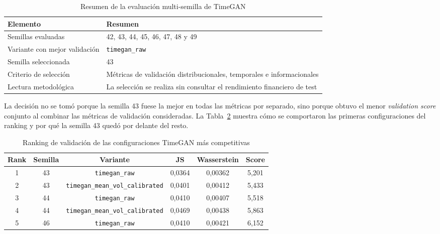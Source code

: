 \documentclass[11pt,a4paper,spanish,oneside]{book}
\numberwithin{equation}{chapter}
\numberwithin{figure}{chapter}
\begin{document}
{\small
\renewcommand{\arraystretch}{1.2}
\begin{table}[H]
\centering
\begin{tabular}{|p{}|p{}|}
\hline
\textbf{Elemento} & \textbf{Resumen} \\
\hline
Semillas evaluadas & 42, 43, 44, 45, 46, 47, 48 y 49 \\
\hline
Variante con mejor validación & \texttt{timegan\_raw} \\
\hline
Semilla seleccionada & 43 \\
\hline
Criterio de selección & Métricas de validación distribucionales, temporales e informacionales \\
\hline
Lectura metodológica & La selección se realiza sin consultar el rendimiento financiero de test \\
\hline
\end{tabular}
\caption{Resumen de la evaluación multi-semilla de TimeGAN}
\label{tab:resumen-timegan-multisemilla}
\end{table}
}

La decisión no se tomó porque la semilla 43 fuese la mejor en todas las métricas por separado, sino porque obtuvo el menor \emph{validation score} conjunto al combinar las métricas de validación consideradas. La Tabla~\ref{tab:ranking-timegan-validacion} muestra cómo se comportaron las primeras configuraciones del ranking y por qué la semilla 43 quedó por delante del resto.

{\small
\renewcommand{\arraystretch}{1.15}
\begin{table}[H]
\centering
\begin{tabular}{|c|c|c|c|c|c|}
\hline
\textbf{Rank} & \textbf{Semilla} & \textbf{Variante} & \textbf{JS} & \textbf{Wasserstein} & \textbf{Score} \\
\hline
1 & 43 & \texttt{timegan\_raw} & 0,0364 & 0,00362 & 5,201 \\
\hline
2 & 43 & \texttt{timegan\_mean\_vol\_calibrated} & 0,0401 & 0,00412 & 5,433 \\
\hline
3 & 44 & \texttt{timegan\_raw} & 0,0410 & 0,00407 & 5,518 \\
\hline
4 & 44 & \texttt{timegan\_mean\_vol\_calibrated} & 0,0469 & 0,00438 & 5,863 \\
\hline
5 & 46 & \texttt{timegan\_raw} & 0,0410 & 0,00421 & 6,152 \\
\hline
\end{tabular}
\caption{Ranking de validación de las configuraciones TimeGAN más competitivas}
\label{tab:ranking-timegan-validacion}
\end{table}
}
\end{document}
